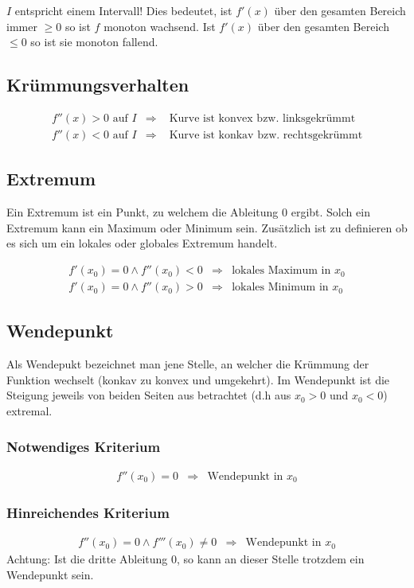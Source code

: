 \noindent
$I$ entspricht einem Intervall! Dies bedeutet, ist $f'(x)$ über den gesamten 
Bereich immer $\geq 0$ so ist $f$ monoton wachsend. Ist $f'(x)$ über den 
gesamten Bereich $\leq 0$ so ist sie monoton fallend.

\subsection{Krümmungsverhalten}

\[ \boxed{ \begin{matrix}
f''(x) > 0 \text{ auf } I & \Rightarrow  
& \text{ Kurve ist konvex bzw. linksgekrümmt} \\
f''(x) < 0 \text{ auf } I & \Rightarrow  
& \text{ Kurve ist konkav bzw. rechtsgekrümmt}
\end{matrix} } \]

\subsection{Extremum}
Ein Extremum ist ein Punkt, zu welchem die Ableitung $0$ ergibt.
Solch ein Extremum kann ein Maximum oder Minimum sein.
Zusätzlich ist zu definieren ob es sich um ein lokales oder globales Extremum 
handelt.

\[ \boxed{ \begin{matrix}
f'(x_0) = 0 \land f''(x_0) < 0 & \Rightarrow & \text{lokales Maximum in $x_0$}\\
f'(x_0) = 0 \land f''(x_0) > 0 & \Rightarrow & \text{lokales Minimum in $x_0$} 
\end{matrix} } \]

\subsection{Wendepunkt}
Als Wendepukt bezeichnet man jene Stelle, an welcher die Krümmung der Funktion 
wechselt (konkav zu konvex und umgekehrt).
Im Wendepunkt ist die Steigung jeweils von beiden Seiten aus betrachtet 
(d.h aus $x_0 > 0$ und $x_0<0$) extremal.

\subsubsection{Notwendiges Kriterium}
\[ \boxed{ \begin{matrix}
f''(x_0) = 0 & \Rightarrow & \text{Wendepunkt in $x_0$}
\end{matrix} } \]

\subsubsection{Hinreichendes Kriterium}
\[ \boxed{ \begin{matrix}
f''(x_0) = 0 \land f'''(x_0) \neq 0 & \Rightarrow & \text{Wendepunkt in $x_0$}
\end{matrix} } \]
Achtung: Ist die dritte Ableitung 0, so kann an dieser Stelle trotzdem ein 
Wendepunkt sein. 


